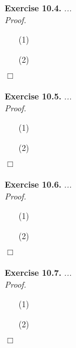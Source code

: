 \documentclass{article}
\begin{document}



\textbf{Exercise 10.4.}
\emph{...} \\

\emph{Proof.}
\begin{enumerate}
\item[(1)]
\item[(2)]

\end{enumerate}
$\Box$ \\\\






\textbf{Exercise 10.5.}
\emph{...} \\

\emph{Proof.}
\begin{enumerate}
\item[(1)]
\item[(2)]

\end{enumerate}
$\Box$ \\\\






\textbf{Exercise 10.6.}
\emph{...} \\

\emph{Proof.}
\begin{enumerate}
\item[(1)]
\item[(2)]

\end{enumerate}
$\Box$ \\\\






\textbf{Exercise 10.7.}
\emph{...} \\

\emph{Proof.}
\begin{enumerate}
\item[(1)]
\item[(2)]

\end{enumerate}
$\Box$ \\\\
\end{document}
